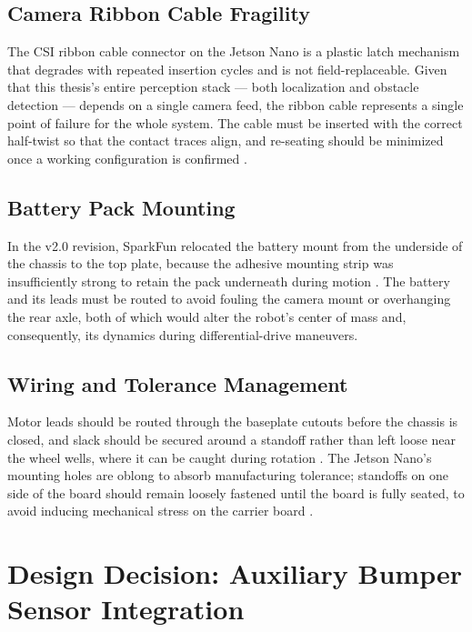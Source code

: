 \subsection{Camera Ribbon Cable Fragility}

The CSI ribbon cable connector on the Jetson Nano is a plastic latch mechanism that degrades with repeated insertion cycles and is not field-replaceable. Given that this thesis's entire perception stack --- both localization and obstacle detection --- depends on a single camera feed, the ribbon cable represents a single point of failure for the whole system. The cable must be inserted with the correct half-twist so that the contact traces align, and re-seating should be minimized once a working configuration is confirmed \cite{SparkFunJetBotAssembly:2020}.

\subsection{Battery Pack Mounting}

In the v2.0 revision, SparkFun relocated the battery mount from the underside of the chassis to the top plate, because the adhesive mounting strip was insufficiently strong to retain the pack underneath during motion \cite{SparkFunJetBotAssembly:2020}. The battery and its leads must be routed to avoid fouling the camera mount or overhanging the rear axle, both of which would alter the robot's center of mass and, consequently, its dynamics during differential-drive maneuvers.

\subsection{Wiring and Tolerance Management}

Motor leads should be routed through the baseplate cutouts before the chassis is closed, and slack should be secured around a standoff rather than left loose near the wheel wells, where it can be caught during rotation \cite{SparkFunJetBotAssembly:2020}. The Jetson Nano's mounting holes are oblong to absorb manufacturing tolerance; standoffs on one side of the board should remain loosely fastened until the board is fully seated, to avoid inducing mechanical stress on the carrier board \cite{JetsonUserManual:2020}.

\section{Design Decision: Auxiliary Bumper Sensor Integration}

